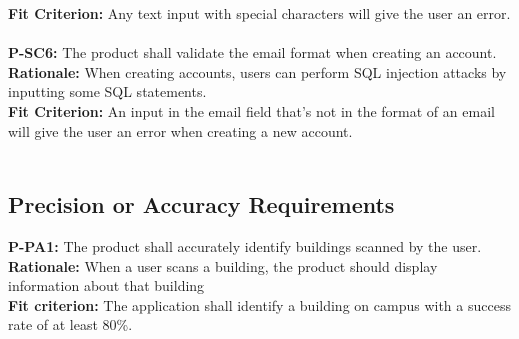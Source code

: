 \documentclass[12pt]{article}
\begin{document}
  \textbf{Fit Criterion:} Any text input with special characters will give the user an error.\\\\
  \textbf{P-SC6:} The product shall validate the email format when creating an account.\\
  \textbf{Rationale:} When creating accounts, users can perform SQL injection attacks by inputting some SQL statements.\\
  \textbf{Fit Criterion:} An input in the email field that's not in the format of an email will give the user an error when creating a new account.\\\\

\subsection{Precision or Accuracy Requirements}
  \textbf{P-PA1:} The product shall accurately identify buildings scanned by the user.\\
  \textbf{Rationale:} When a user scans a building, the product should display information about that building\\
  \textbf{Fit criterion:} The application shall identify a building on campus with a success rate of at least 80\%.\\\\
\end{document}
